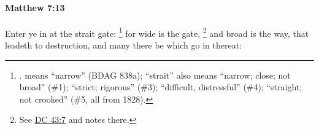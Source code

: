 			\begin{framed}
			\scriptsize
				\begin{compactdesc}
					\item[SBLG] 
				\end{compactdesc}
			\end{framed}

		\paragraph{Matthew 7:13} %
			\label{MATTHEW-7-13}

			Enter ye in at the strait gate:%
				\footnote{%
					.  means ``narrow'' (BDAG 838a); ``strait'' also means ``narrow; close; not broad'' (\#1); ``strict; rigorous'' (\#3); ``difficult, distressful'' (\#4); ``straight; not crooked'' (\#5, all from 1828).
					}
			for wide is the gate,%
				\footnote{%
					See \hyperref[DC43-7]{DC 43:7} and notes there.
					}
			and broad is the way, that leadeth to destruction, and many there be which go in thereat:

